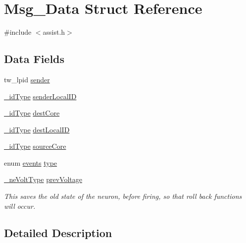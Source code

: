 \hypertarget{struct_msg___data}{}\section{Msg\+\_\+\+Data Struct Reference}
\label{struct_msg___data}


{\ttfamily \#include $<$assist.\+h$>$}

\subsection*{Data Fields}
\begin{DoxyCompactItemize}
\item 
tw\+\_\+lpid \hyperlink{struct_msg___data_ac94c7cb1b3f009936733d0f0cec9f72a}{sender}
\item 
\hyperlink{mappings_8c_adc0d1d400308f82e4d42245c2fd946b9}{\+\_\+id\+Type} \hyperlink{struct_msg___data_af4e0329991e30bd3958b93c3bbb3038d}{sender\+Local\+I\+D}
\item 
\hyperlink{mappings_8c_adc0d1d400308f82e4d42245c2fd946b9}{\+\_\+id\+Type} \hyperlink{struct_msg___data_a0ce9b87ee4780bfc676814cf8d485a97}{dest\+Core}
\item 
\hyperlink{mappings_8c_adc0d1d400308f82e4d42245c2fd946b9}{\+\_\+id\+Type} \hyperlink{struct_msg___data_aa0359599db6f5e6c68ac2b7123b4147a}{dest\+Local\+I\+D}
\item 
\hyperlink{mappings_8c_adc0d1d400308f82e4d42245c2fd946b9}{\+\_\+id\+Type} \hyperlink{struct_msg___data_a13b05c6b2a199a7bdf79a18b9e7c22e9}{source\+Core}
\item 
enum \hyperlink{assist_8h_ad29858f6d8ab73f2970f41cb21a76b84}{events} \hyperlink{struct_msg___data_ab8720847cee557678e9bfc7da95d46bf}{type}
\item 
\hyperlink{mappings_8c_a368ddcd71f7b61cb0f918f22d07ce999}{\+\_\+ne\+Volt\+Type} \hyperlink{struct_msg___data_a20818fc301603eac9d3685ba53424699}{prev\+Voltage}
\begin{DoxyCompactList}\small\item\em This saves the old state of the neuron, before firing, so that roll back functions will occur. \end{DoxyCompactList}\end{DoxyCompactItemize}


\subsection{Detailed Description}


